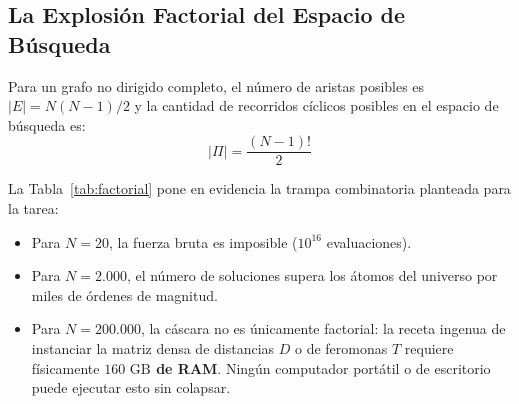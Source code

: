 \documentclass[11pt,a4paper]{article}
\begin{document}
\subsection{La Explosión Factorial del Espacio de Búsqueda}
Para un grafo no dirigido completo, el número de aristas posibles es $|E| = N(N-1)/2$ y la cantidad de recorridos cíclicos posibles en el espacio de búsqueda es:
\begin{equation}
    |\Pi| = \frac{(N-1)!}{2}
\end{equation}

\begin{table}[H]
\centering
\caption{Escalamiento combinatorio del espacio factorial y demanda de almacenamiento.}
\label{tab:factorial}
\end{table}

La Tabla~\ref{tab:factorial} pone en evidencia la trampa combinatoria planteada para la tarea:
\begin{itemize}
    \item Para $N = 20$, la fuerza bruta es imposible ($10^{16}$ evaluaciones).
    \item Para $N = 2.000$, el número de soluciones supera los átomos del universo por miles de órdenes de magnitud.
    \item Para $N = 200.000$, la cáscara no es únicamente factorial: la receta ingenua de instanciar la matriz densa de distancias $D$ o de feromonas $T$ requiere físicamente \textbf{$160\text{ GB}$ de RAM}. Ningún computador portátil o de escritorio puede ejecutar esto sin colapsar.
\end{itemize}
\end{document}
